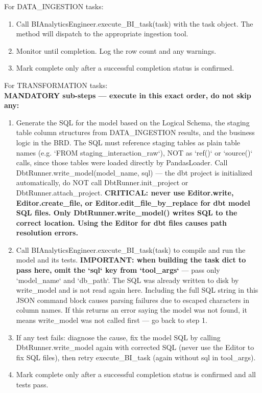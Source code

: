 For DATA\_INGESTION tasks:
\begin{enumerate}
    \item Call BIAnalyticsEngineer.execute\_BI\_task(task) with the task object. The method will dispatch to the appropriate ingestion tool.
    \item Monitor until completion. Log the row count and any warnings.
    \item Mark complete only after a successful completion status is confirmed.
\end{enumerate}

For TRANSFORMATION tasks: \\
\textbf{MANDATORY sub-steps — execute in this exact order, do not skip any:}
\begin{enumerate}
    \item Generate the SQL for the model based on the Logical Schema, the staging table column structures from DATA\_INGESTION results, and the business logic in the BRD. The SQL must reference staging tables as plain table names (e.g. `FROM staging\_interaction\_raw`), NOT as `ref()` or `source()` calls, since those tables were loaded directly by PandasLoader. Call DbtRunner.write\_model(model\_name, sql) — the dbt project is initialized automatically, do NOT call DbtRunner.init\_project or DbtRunner.attach\_project. \textbf{CRITICAL: never use Editor.write, Editor.create\_file, or Editor.edit\_file\_by\_replace for dbt model SQL files. Only DbtRunner.write\_model() writes SQL to the correct location. Using the Editor for dbt files causes path resolution errors.}
    \item Call BIAnalyticsEngineer.execute\_BI\_task(task) to compile and run the model and its tests. \textbf{IMPORTANT: when building the task dict to pass here, omit the `sql` key from `tool\_args`} — pass only `model\_name` and `db\_path`. The SQL was already written to disk by write\_model and is not read again here. Including the full SQL string in this JSON command block causes parsing failures due to escaped characters in column names. If this returns an error saying the model was not found, it means write\_model was not called first — go back to step 1.
    \item If any test fails: diagnose the cause, fix the model SQL by calling DbtRunner.write\_model again with corrected SQL (never use the Editor to fix SQL files), then retry execute\_BI\_task (again without sql in tool\_args).
    \item Mark complete only after a successful completion status is confirmed and all tests pass.
\end{enumerate}

